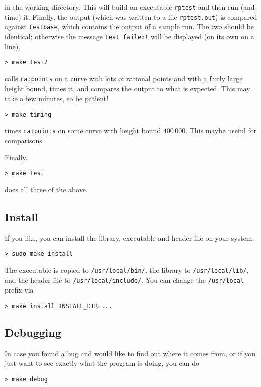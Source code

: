 \documentclass[12pt,a4paper,oneside]{amsart}
\begin{document}
in the working directory. This will build an executable \texttt{rptest} and
then run (and time) it. Finally, the output (which was written to a file
\texttt{rptest.out}) is compared against \texttt{testbase}, which contains the
output of a sample run. The two should be identical; otherwise the
message \texttt{Test failed!} will be displayed (on its own on a line).

\begin{verbatim}
> make test2
\end{verbatim}
calls \texttt{ratpoints} on a curve with lots of rational points and with
a fairly large height bound, times it, and compares the output to what is
expected. This may take a few minutes, so be patient!

\begin{verbatim}
> make timing
\end{verbatim}
times \texttt{ratpoints} on some curve with height bound $400\,000$.
This maybe useful for comparisons.

Finally,
\begin{verbatim}
> make test
\end{verbatim}
does all three of the above.

\subsection{Install}

If you like, you can install the library, executable and header file
on your system.

\begin{verbatim}
> sudo make install
\end{verbatim}

The executable is copied to \texttt{/usr/local/bin/}, the
library to \texttt{/usr/local/lib/}, and the header file to
\texttt{/usr/local/include/}. You can change the \texttt{/usr/local} prefix
via
\begin{verbatim}
> make install INSTALL_DIR=...
\end{verbatim}

\subsection{Debugging}

In case you found a bug and would like to find out where it comes from,
or if you just want to see exactly what the program is doing, you can
do

\begin{verbatim}
> make debug
\end{verbatim}
\end{document}
